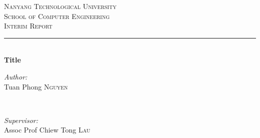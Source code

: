 \begin{titlepage}

\newcommand{\HRule}{\rule{\linewidth}{0.5mm}} %

\center %
 

\textsc{\LARGE Nanyang Technological University}\\[1.5cm] %
\textsc{\Large School of Computer Engineering}\\[0.5cm] %
\textsc{\large Interim Report}\\[0.5cm] %


\HRule \\[0.4cm] { \huge \bfseries Title}\\[0.4cm] %
 

\begin{minipage}{0.4\textwidth}
    \begin{flushleft}
        \large \emph{Author:}\\ Tuan Phong
        \textsc{Nguyen} %
    \end{flushleft}
\end{minipage} ~
\begin{minipage}{0.4\textwidth}
    \begin{flushright}
        \large \emph{Supervisor:} \\ Assoc Prof Chiew Tong
        \textsc{Lau} %
    \end{flushright}
\end{minipage}


\end{titlepage}

